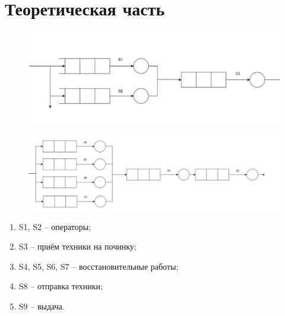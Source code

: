 \section{Теоретическая часть}

\begin{figure}[h]
	\centering
	\includegraphics[width=0.7\linewidth]{src/Снимок}
	\caption{}
	\label{fig:}
\end{figure}

\begin{figure}[h]
	\centering
	\includegraphics[width=0.7\linewidth]{src/Снимок1}
	\caption{}
	\label{fig:1}
\end{figure}

\begin{enumerate}
	\item S1, S2 – операторы;
	\item S3 – приём техники на починку;
	\item S4, S5, S6, S7 – восстановительные работы;
	\item S8 – отправка техники;
	\item S9 – выдача.
\end{enumerate}






